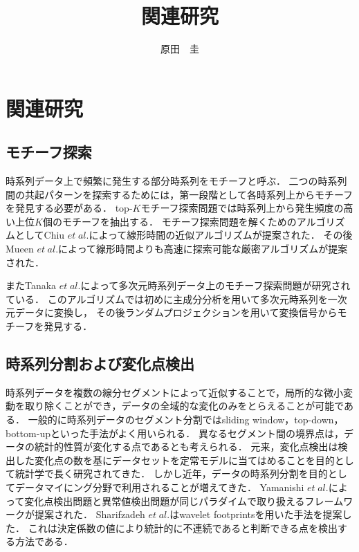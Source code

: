 \documentclass[11pt,j4a]{jarticle}
\title{関連研究}
\author{原田　圭}
\begin{document}
\maketitle
\section{関連研究}
\subsection{モチーフ探索}
時系列データ上で頻繁に発生する部分時系列をモチーフと呼ぶ\cite{lonardi2002finding}．
二つの時系列間の共起パターンを探索するためには，第一段階として各時系列上からモチーフを発見する必要がある．
top-$K$モチーフ探索問題では時系列上から発生頻度の高い上位$K$個のモチーフを抽出する．
モチーフ探索問題を解くためのアルゴリズムとしてChiu $et \hspace{3pt} al.$\cite{chiu2003probabilistic}によって線形時間の近似アルゴリズムが提案された．
その後Mueen $et \hspace{3pt} al.$\cite{mueen2009exact}によって線形時間よりも高速に探索可能な厳密アルゴリズムが提案された．

またTanaka $et \hspace{3pt} al.$によって多次元時系列データ上のモチーフ探索問題が研究されている．
このアルゴリズムでは初めに主成分分析を用いて多次元時系列を一次元データに変換し，
その後ランダムプロジェクション\cite{lonardi2002finding}を用いて変換信号からモチーフを発見する．

\subsection{時系列分割および変化点検出}
時系列データを複数の線分セグメントによって近似することで，局所的な微小変動を取り除くことができ，データの全域的な変化のみをとらえることが可能である．
一般的に時系列データのセグメント分割ではsliding window，top-down，bottom-upといった手法がよく用いられる\cite{keogh2001online}．
異なるセグメント間の境界点は，データの統計的性質が変化する点であるとも考えられる．
元来，変化点検出は検出した変化点の数を基にデータセットを定常モデルに当てはめることを目的として統計学で長く研究されてきた．
しかし近年，データの時系列分割を目的としてデータマイにング分野で利用されることが増えてきた．
Yamanishi $et \hspace{3pt} al.$\cite{yamanishi2002unifying}によって変化点検出問題と異常値検出問題が同じパラダイムで取り扱えるフレームワークが提案された．
Sharifzadeh $et \hspace{3pt} al.$\cite{sharifzadeh2005change}はwavelet footprints\cite{dragotti2003wavelet}を用いた手法を提案した．
これは決定係数の値により統計的に不連続であると判断できる点を検出する方法である．
\end{document}
